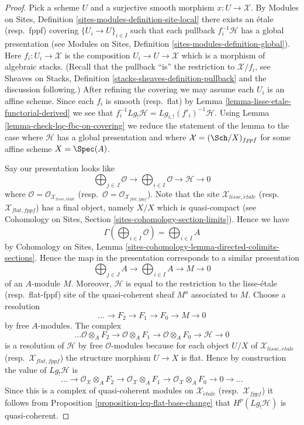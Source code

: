 \begin{proof}
Pick a scheme $U$ and a surjective smooth morphism $x : U \to \mathcal{X}$. By
Modules on Sites, Definition \ref{sites-modules-definition-site-local}
there exists an \'etale (resp.\ fppf) covering
$\{U_i \to U\}_{i \in I}$ such that each pullback $f_i^{-1}\mathcal{H}$
has a global presentation (see
Modules on Sites, Definition \ref{sites-modules-definition-global}).
Here $f_i : U_i \to \mathcal{X}$ is the composition
$U_i \to U \to \mathcal{X}$ which is a morphism of algebraic stacks.
(Recall that the pullback ``is'' the restriction to $\mathcal{X}/f_i$, see
Sheaves on Stacks, Definition \ref{stacks-sheaves-definition-pullback}
and the discussion following.)
After refining the covering we may assume each $U_i$ is an affine scheme.
Since each $f_i$ is smooth (resp.\ flat) by
Lemma \ref{lemma-lisse-etale-functorial-derived}
we see that $f_i^{-1}Lg_!\mathcal{H} = Lg_{i, !}(f'_i)^{-1}\mathcal{H}$.
Using Lemma \ref{lemma-check-lqc-fbc-on-covering}
we reduce the statement of the lemma to the case where $\mathcal{H}$
has a global presentation and where $\mathcal{X} = (\Sch/X)_{fppf}$
for some affine scheme $X = \Spec(A)$.

\medskip\noindent
Say our presentation looks like
$$
\bigoplus\nolimits_{j \in J} \mathcal{O} \longrightarrow
\bigoplus\nolimits_{i \in I} \mathcal{O} \longrightarrow
\mathcal{H} \longrightarrow 0
$$
where $\mathcal{O} = \mathcal{O}_{\mathcal{X}_{lisse,\acute{e}tale}}$
(resp.\ $\mathcal{O} = \mathcal{O}_{\mathcal{X}_{flat,fppf}}$).
Note that the site $\mathcal{X}_{lisse,\acute{e}tale}$
(resp.\ $\mathcal{X}_{flat,fppf}$) has a final object, namely
$X/X$ which is quasi-compact (see
Cohomology on Sites, Section \ref{sites-cohomology-section-limits}).
Hence we have
$$
\Gamma(\bigoplus\nolimits_{i \in I} \mathcal{O}) =
\bigoplus\nolimits_{i \in I} A
$$
by Cohomology on Sites, Lemma
\ref{sites-cohomology-lemma-directed-colimits-sections}. Hence the map
in the presentation corresponds to a similar presentation
$$
\bigoplus\nolimits_{j \in J} A \longrightarrow
\bigoplus\nolimits_{i \in I} A \longrightarrow
M \longrightarrow 0
$$
of an $A$-module $M$. Moreover, $\mathcal{H}$ is equal to the restriction
to the lisse-\'etale (resp.\ flat-fppf) site of the quasi-coherent sheaf
$M^a$ associated to $M$. Choose a resolution
$$
\ldots \to F_2 \to F_1 \to F_0 \to M \to 0
$$
by free $A$-modules. The complex
$$
\ldots \mathcal{O} \otimes_A F_2 \to \mathcal{O} \otimes_A F_1 \to
\mathcal{O} \otimes_A F_0 \to \mathcal{H} \to 0
$$
is a resolution of $\mathcal{H}$ by free $\mathcal{O}$-modules because
for each object $U/X$ of $\mathcal{X}_{lisse,\acute{e}tale}$
(resp.\ $\mathcal{X}_{flat,fppf}$) the structure morphism $U \to X$
is flat. Hence by construction the value of $Lg_!\mathcal{H}$ is
$$
\ldots \to
\mathcal{O}_\mathcal{X} \otimes_A F_2 \to
\mathcal{O}_\mathcal{X} \otimes_A F_1 \to
\mathcal{O}_\mathcal{X} \otimes_A F_0 \to 0 \to \ldots
$$
Since this is a complex of quasi-coherent modules on
$\mathcal{X}_{\acute{e}tale}$ (resp.\ $\mathcal{X}_{fppf}$)
it follows from
Proposition \ref{proposition-lcq-flat-base-change}
that $H^p(Lg_!\mathcal{H})$ is quasi-coherent.
\end{proof}

